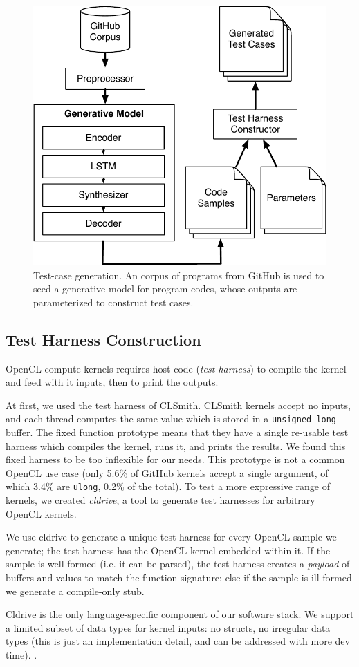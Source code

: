 \begin{figure}
  \centering
  \includegraphics[width=.80\columnwidth]{img/clgen} %
  \caption{%
    Test-case generation. An corpus of programs from GitHub is used to seed a generative model for program codes, whose outputs are parameterized to construct test cases.%
  }%
  \label{fig:deeptune}
\end{figure}


\subsection{Test Harness Construction}

OpenCL compute kernels requires host code (\emph{test harness}) to compile the kernel and feed with it inputs, then to print the outputs.

At first, we used the test harness of CLSmith. CLSmith kernels accept no inputs, and each thread computes the same value which is stored in a \texttt{unsigned long} buffer. The fixed function prototype means that they have a single re-usable test harness which compiles the kernel, runs it, and prints the results. We found this fixed harness to be too inflexible for our needs. This prototype is not a common OpenCL use case (only 5.6\% of GitHub kernels accept a single argument, of which 3.4\% are \texttt{ulong}, 0.2\% of the total).
To test a more expressive range of kernels, we created \emph{cldrive}, a tool to generate test harnesses for arbitrary OpenCL kernels.

We use cldrive to generate a unique test harness for every OpenCL sample we generate; the test harness has the OpenCL kernel embedded within it. If the sample is well-formed (i.e. it can be parsed), the test harness creates a \emph{payload} of buffers and values to match the function signature; else if the sample is ill-formed we generate a compile-only stub. 

Cldrive is the only language-specific component of our software stack. We support a limited subset of data types for kernel inputs: no structs, no irregular data types (this is just an implementation detail, and can be addressed with more dev time). .
